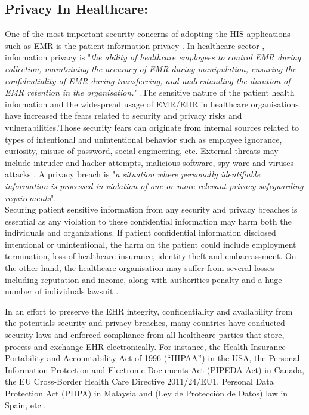 \subsection{Privacy In Healthcare:}
One of the most important security concerns of adopting the HIS applications such as EMR is the patient information privacy \cite{Mahfuth2016}. In healthcare sector , information privacy is "\textit{the ability of healthcare employees to control EMR during collection, maintaining the accuracy of EMR during manipulation, ensuring the confidentiality of EMR during transferring, and understanding the duration of EMR retention in the organisation.}" \cite{Rahim2016}.The sensitive nature of the patient health information and the widespread usage of EMR/EHR in healthcare organisations have increased the fears related to security and privacy risks and vulnerabilities.Those security fears can originate from internal sources related to types of intentional and unintentional behavior such as employee ignorance, curiosity, misuse of password, social engineering, etc. External threats may include intruder and hacker attempts, malicious software, spy ware and viruses attacks  \cite{Samy2010b}. A privacy breach is "\textit{a situation where personally identifiable information is processed in violation of one or more relevant privacy safeguarding requirements}"\cite{ISO/IEC}.\\Securing patient sensitive information from any security and privacy breaches is essential as any violation to these confidential information may harm both the individuals and organizations. If patient confidential information disclosed intentional or unintentional, the harm on the patient could include employment termination, loss of healthcare insurance, identity theft and embarrassment. On the other hand, the healthcare organisation may suffer from several losses including reputation and income, along with authorities penalty and a huge number of individuals lawsuit \cite{Wartenberg2010,Culnan2016}. 

In an effort to preserve the EHR integrity, confidentiality and availability from the potentials security and privacy breaches, many countries have conducted security laws and enforced compliance from all healthcare parties that store, process and exchange EHR electronically\cite{Hsu,Samy2010,Rahim2016}. For instance, the Health Insurance Portability and Accountability Act of 1996 (“HIPAA”) in the USA, the Personal Information Protection and Electronic Documents Act (PIPEDA  Act) in Canada, the EU Cross-Border Health Care Directive 2011/24/EU1, Personal Data Protection Act (PDPA) in Malaysia and (Ley de Protección de Datos) law in Spain, etc \cite{Bensefia2014,U.S.DepartmentofHealthandHumanServices}. 



